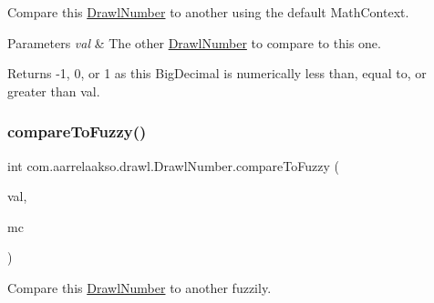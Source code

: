 Compare this \hyperlink{classcom_1_1aarrelaakso_1_1drawl_1_1_drawl_number}{Drawl\+Number} to another using the default Math\+Context. 


\begin{DoxyParams}{Parameters}
{\em val} & The other \hyperlink{classcom_1_1aarrelaakso_1_1drawl_1_1_drawl_number}{Drawl\+Number} to compare to this one. \\
\hline
\end{DoxyParams}
\begin{DoxyReturn}{Returns}
-\/1, 0, or 1 as this Big\+Decimal is numerically less than, equal to, or greater than val. 
\end{DoxyReturn}
\mbox{\label{classcom_1_1aarrelaakso_1_1drawl_1_1_drawl_number_ad2df3badb1fc05c8de18403a44835c98}} 
\subsubsection{\texorpdfstring{compare\+To\+Fuzzy()}{compareToFuzzy()}\hspace{0.1cm}{\footnotesize\ttfamily [2/2]}}
{\footnotesize\ttfamily int com.\+aarrelaakso.\+drawl.\+Drawl\+Number.\+compare\+To\+Fuzzy (\begin{DoxyParamCaption}\item[{\hyperlink{classcom_1_1aarrelaakso_1_1drawl_1_1_drawl_number}{Drawl\+Number}}]{val,  }\item[{Math\+Context}]{mc }\end{DoxyParamCaption})\hspace{0.3cm}{\ttfamily [protected]}}



Compare this \hyperlink{classcom_1_1aarrelaakso_1_1drawl_1_1_drawl_number}{Drawl\+Number} to another fuzzily. 


